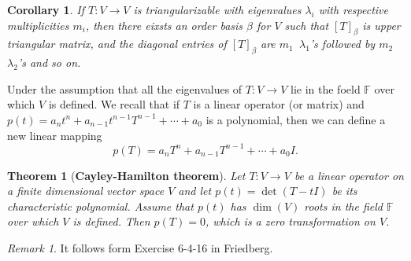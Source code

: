 \documentclass[12pt,reqno]{amsart}
\theoremstyle{plain}
\newcommand{\F}{\mathbb{F}}
\newtheorem{theorem}{Theorem}[section]
\newtheorem{corollary}{Corollary}[section]
\theoremstyle{remark}
\newtheorem*{remark}{Remark}
\begin{document}
\begin{corollary}
	If $T:V\rightarrow V$ is triangularizable with eigenvalues $\lambda_i$ with respective multiplicities $m_i$, then there eixsts an order basis $\beta$ for $V$ such that $[T]_{\beta}$ is upper triangular matrix, and the diagonal entries of $[T]_{\beta}$ are $m_1$~$\lambda_1$'s followed by $m_2$~$\lambda_2$'s and so on.
\end{corollary}

Under the assumption that all the eigenvalues of $T: V \rightarrow V$ lie in the foeld $\F$ over which $V$ is defined. We recall that if $T$ is a linear operator (or matrix)  and $p(t) = a_nt^n + a_{n-1}t^{n-1}T^{n-1} + \cdots + a_0$ is a polynomial, then we can define a new linear mapping
$$p(T) = a_nT^n + a_{n-1}T^{n-1}+\cdots + a_0I.$$

\begin{theorem} [\textbf{Cayley-Hamilton theorem}]
	Let $T:V \rightarrow V$ be a linear operator on a finite dimensional vector space $V$ and let $p(t)=\det(T - tI)$ be its characteristic polynomial. Assume that $p(t)$ has $\dim(V)$ roots in the field $\F$ over which $V$ is defined. Then $p(T) = 0$, which is a zero transformation on $V$.
\end{theorem}

\begin{remark}
	It follows form Exercise 6-4-16 in Friedberg.
\end{remark}
\end{document}
